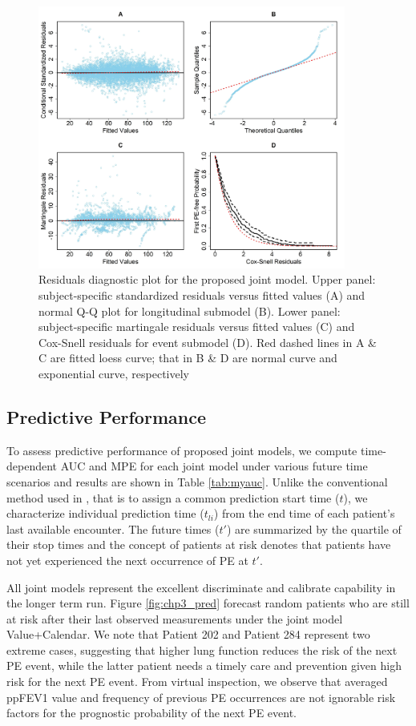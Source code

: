\begin{figure}[H]
\includegraphics[width=0.9\textwidth]{Figures/Chp3_DIAG.jpg}
\caption{Residuals diagnostic plot for the proposed joint model. Upper panel: subject-specific standardized residuals versus fitted values (A) and normal Q-Q plot for longitudinal submodel (B). Lower panel: subject-specific martingale residuals versus fitted values (C) and Cox-Snell residuals for event submodel (D). Red dashed lines in A \& C are fitted loess curve; that in B \& D are normal curve and exponential curve, respectively}
\label{fig:chp3_diag}
\end{figure}

\subsection{Predictive Performance}

To assess predictive performance of proposed joint models, we compute time-dependent AUC and MPE for each joint model under various future time scenarios and results are shown in Table \ref{tab:myauc}. Unlike the conventional method used in \cite{Ren2021}, that is to assign a common prediction start time ($t$), we characterize individual prediction time ($t_{li}$) from the end time of each patient's last available encounter. The future times ($t'$) are summarized by the quartile of their stop times and the concept of patients at risk denotes that patients have not yet experienced the next occurrence of PE at $t'$.  

All joint models represent the excellent discriminate and calibrate capability in the longer term run. Figure \ref{fig:chp3_pred} forecast random patients who are still at risk after their last observed measurements under the joint model Value+Calendar. We note that Patient 202 and Patient 284 represent two extreme cases, suggesting that higher lung function reduces the risk of the next PE event, while the latter patient needs a timely care and prevention given high risk for the next PE event. From virtual inspection, we observe that averaged ppFEV1 value and frequency of previous PE occurrences are not ignorable risk factors for the prognostic probability of the next PE event.

